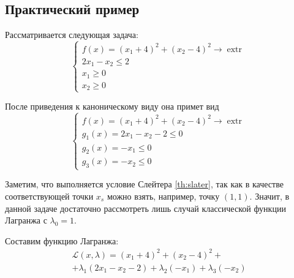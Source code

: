 \documentclass{article}
\renewcommand{\leq}{\leqslant}
\renewcommand{\geq}{\geqslant}
\providecommand{\La}{\mathcal{L}}
\DeclareMathOperator{\extr}{extr}
\theoremstyle{remark}
\theoremstyle{definition}
\numberwithin{equation}{section}
\begin{document}
\clearpage
\subsection{Практический пример}

Рассматривается следующая задача:
\begin{equation*}
  \begin{cases}
    f(x) = (x_1+4)^2 + (x_2-4)^2 \to \extr \\
    2x_1 - x_2 \leq 2 \\
    x_1 \geq 0 \\
    x_2 \geq 0
  \end{cases}
\end{equation*}

После приведения к каноническому виду она примет вид
\begin{equation}
  \label{eq:cond-optim-problem}
  \begin{cases}
    f(x) = (x_1+4)^2 + (x_2-4)^2 \to \extr \\
    g_1(x) = 2x_1 - x_2 - 2 \leq 0 \\
    g_2(x) = -x_1 \leq 0 \\
    g_3(x) = -x_2 \leq 0
  \end{cases}
\end{equation}

Заметим, что выполняется условие Слейтера \ref{th:slater}, так как в
качестве соответствующей точки $x_s$ можно взять, например, точку $(1,
1)$. Значит, в данной задаче достаточно рассмотреть лишь случай
классической функции Лагранжа с $\lambda_0=1$.

Составим функцию Лагранжа:
\begin{multline}
  \label{eq:lagrange}
  \La(x, \lambda) = (x_1+4)^2 + (x_2-4)^2 +\\
  + \lambda_1(2x_1-x_2-2)+\lambda_2(-x_1)+\lambda_3(-x_2)
\end{multline}
\end{document}
